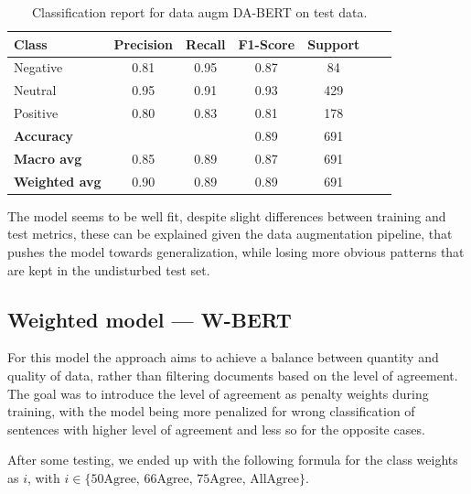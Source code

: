 \documentclass[conference]{IEEEtran}
\begin{document}
\begin{table}[H]
\centering
\caption{Classification report for data augm DA-BERT on test data.}
\label{cr_augmbert_test}
\begin{tabular}{lcccccc}
\toprule
\textbf{Class} & \textbf{Precision} & \textbf{Recall} & \textbf{F1-Score} & \textbf{Support} \\
\midrule
Negative & 0.81 & 0.95 & 0.87 & 84 \\
Neutral & 0.95 & 0.91 & 0.93 & 429 \\
Positive & 0.80 & 0.83 & 0.81 & 178 \\
\midrule
\textbf{Accuracy} &  &  & 0.89 & 691 \\
\textbf{Macro avg} & 0.85 & 0.89 & 0.87 & 691 \\
\textbf{Weighted avg} & 0.90 & 0.89 & 0.89 & 691 \\
\bottomrule
\end{tabular}
\end{table}

The model seems to be well fit, despite slight differences between training and test metrics, these can be explained given the data augmentation pipeline, that pushes the model towards generalization, while losing more obvious patterns that are kept in the undisturbed test set. 





\subsection{Weighted model — W-BERT}

For this model the approach aims to achieve a balance between quantity and quality of data, rather than filtering documents based on the level of agreement. The goal was to introduce the level of agreement as penalty weights during training, with the model being more penalized for wrong classification of sentences with higher level of agreement and less so for the opposite cases.

After some testing, we ended up with the following formula for the class weights as $i$, with $i \in \{\text{50Agree, 66Agree, 75Agree, AllAgree}\}$.

\end{document}
